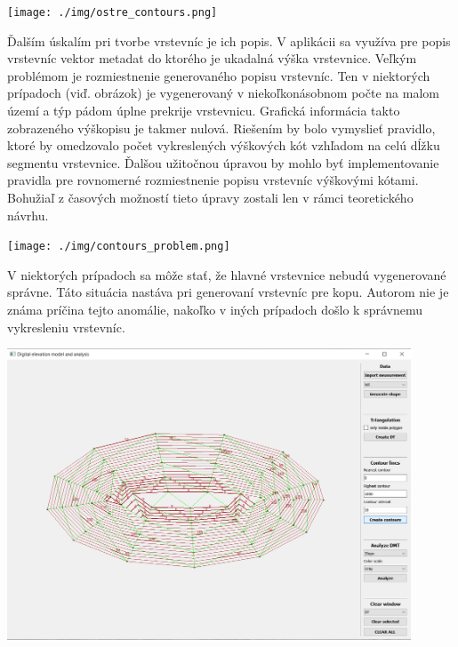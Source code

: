 \documentclass[12pt]{article}
\begin{document}
\begin{center}
   \texttt{[image: ./img/ostre\_contours.png]}
\end{center}

Ďalším úskalím pri tvorbe vrstevníc je ich popis. V aplikácii sa využíva pre popis vrstevníc vektor metadat do ktorého je ukadalná výška vrstevnice. Veľkým problémom je rozmiestnenie generovaného popisu vrstevníc. Ten v niektorých prípadoch (viď. obrázok) je vygenerovaný v niekoľkonásobnom počte na malom území a týp pádom úplne prekrije vrstevnicu. Grafická informácia takto zobrazeného výškopisu je takmer nulová.  Riešením by bolo vymyslieť pravidlo, ktoré by omedzovalo počet vykreslených výškových kót vzhľadom na celú dĺžku segmentu vrstevnice. Ďalšou užitočnou úpravou by mohlo byť implementovanie pravidla pre rovnomerné rozmiestnenie popisu vrstevníc výškovými kótami. Bohužiaľ z časových možností tieto úpravy zostali len v rámci teoretického návrhu.

\begin{center}
   \texttt{[image: ./img/contours\_problem.png]}
\end{center}

V niektorých prípadoch sa môže stať, že hlavné vrstevnice nebudú vygenerované správne. Táto situácia nastáva pri generovaní vrstevníc pre kopu. Autorom nie je známa príčina tejto anomálie, nakoľko v iných prípadoch došlo k správnemu vykresleniu vrstevníc.

\begin{center}
   \includegraphics[width=12cm]{./img/hill_contours.png}
\end{center}
\end{document}

